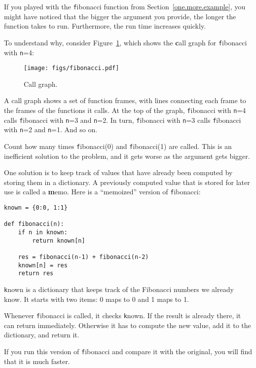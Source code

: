 \documentclass[
DIV=11,
fontsize=13,
twoside,
headinclude=false,
titlepage=firstiscover,
abstract=true,
headsepline=true,
footsepline=true,
chapterprefix=true, %
headings=big,
bibliography=totoc,%
captions=tableheading
]{scrbook}
\theoremstyle{definition}
\begin{document}
If you played with the {\texttt fibonacci} function from
Section~\ref{one.more.example}, you might have noticed that the bigger
the argument you provide, the longer the function takes to run.
Furthermore, the run time increases quickly.

To understand why, consider Figure~\ref{fig.fibonacci}, which shows
the {\textbf call graph} for {\texttt fibonacci} with {\texttt n=4}:

\begin{figure}
\centerline
{\texttt{[image: figs/fibonacci.pdf]}}
\caption{Call graph.}
\label{fig.fibonacci}
\end{figure}

A call graph shows a set of function frames, with lines connecting each
frame to the frames of the functions it calls.  At the top of the
graph, {\texttt fibonacci} with {\texttt n=4} calls {\texttt fibonacci} with {\texttt
n=3} and {\texttt n=2}.  In turn, {\texttt fibonacci} with {\texttt n=3} calls
{\texttt fibonacci} with {\texttt n=2} and {\texttt n=1}.  And so on.

Count how many times {\texttt fibonacci(0)} and {\texttt fibonacci(1)} are
called.  This is an inefficient solution to the problem, and it gets
worse as the argument gets bigger.

One solution is to keep track of values that have already been
computed by storing them in a dictionary.  A previously computed value
that is stored for later use is called a {\textbf memo}.  Here is a
``memoized'' version of {\texttt fibonacci}:

\begin{lstlisting}
known = {0:0, 1:1}

def fibonacci(n):
    if n in known:
        return known[n]

    res = fibonacci(n-1) + fibonacci(n-2)
    known[n] = res
    return res
\end{lstlisting}
%
{\texttt known} is a dictionary that keeps track of the Fibonacci
numbers we already know.  It starts with
two items: 0 maps to 0 and 1 maps to 1.

Whenever {\texttt fibonacci} is called, it checks {\texttt known}.
If the result is already there, it can return
immediately.  Otherwise it has to 
compute the new value, add it to the dictionary, and return it.

If you run this version of {\texttt fibonacci} and compare it with
the original, you will find that it is much faster.
\end{document}
